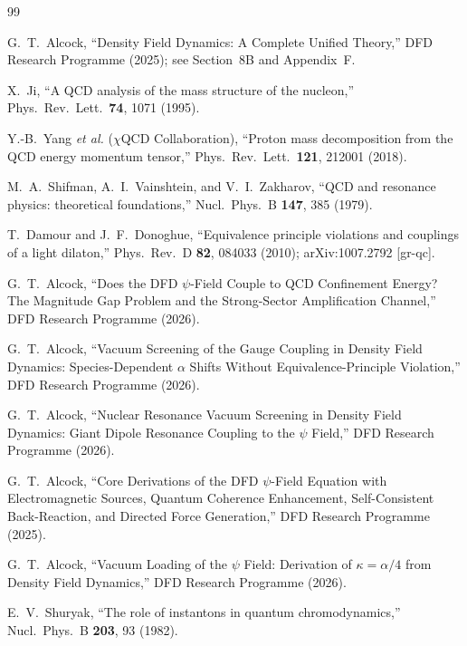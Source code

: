 \documentclass[aps,prd,twocolumn,superscriptaddress,floatfix,nofootinbib]{revtex4-2}
\begin{document}
\begin{thebibliography}{99}

G.~T.~Alcock,
``Density Field Dynamics: A Complete Unified Theory,''
DFD Research Programme (2025);
see Section~8B and Appendix~F.

X.~Ji,
``A QCD analysis of the mass structure of the nucleon,''
Phys.\ Rev.\ Lett.\ \textbf{74}, 1071 (1995).

Y.-B.~Yang \emph{et al.} ($\chi$QCD Collaboration),
``Proton mass decomposition from the QCD energy momentum tensor,''
Phys.\ Rev.\ Lett.\ \textbf{121}, 212001 (2018).

M.~A.~Shifman, A.~I.~Vainshtein, and V.~I.~Zakharov,
``QCD and resonance physics: theoretical foundations,''
Nucl.\ Phys.\ B \textbf{147}, 385 (1979).

T.~Damour and J.~F.~Donoghue,
``Equivalence principle violations and couplings of a light dilaton,''
Phys.\ Rev.\ D \textbf{82}, 084033 (2010);
arXiv:1007.2792 [gr-qc].

G.~T.~Alcock,
``Does the DFD $\psi$-Field Couple to QCD Confinement Energy?
The Magnitude Gap Problem and the Strong-Sector Amplification Channel,''
DFD Research Programme (2026).

G.~T.~Alcock,
``Vacuum Screening of the Gauge Coupling in Density Field Dynamics:
Species-Dependent $\alpha$ Shifts Without Equivalence-Principle Violation,''
DFD Research Programme (2026).

G.~T.~Alcock,
``Nuclear Resonance Vacuum Screening in Density Field Dynamics:
Giant Dipole Resonance Coupling to the $\psi$ Field,''
DFD Research Programme (2026).

G.~T.~Alcock,
``Core Derivations of the DFD $\psi$-Field Equation
with Electromagnetic Sources, Quantum Coherence Enhancement,
Self-Consistent Back-Reaction, and Directed Force Generation,''
DFD Research Programme (2025).

G.~T.~Alcock,
``Vacuum Loading of the $\psi$ Field: Derivation of $\kappa = \alpha/4$
from Density Field Dynamics,''
DFD Research Programme (2026).

E.~V.~Shuryak,
``The role of instantons in quantum chromodynamics,''
Nucl.\ Phys.\ B \textbf{203}, 93 (1982).


\end{thebibliography}
\end{document}
